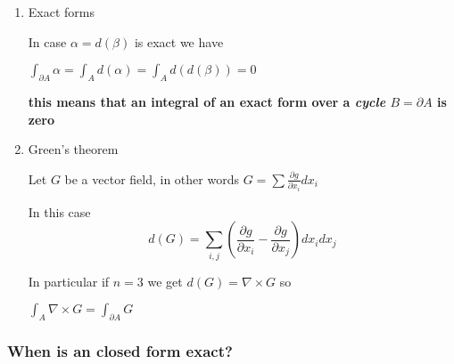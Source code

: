 \documentclass[11pt]{article}
\begin{document}
\begin{enumerate}
\item Exact forms
\label{sec:orgdaad73a}

In case \(\alpha = d(\beta)\) is exact we have

\(\int_{\partial A} \alpha = \int_A d(\alpha) = \int_A d(d(\beta)) = 0\)

\textbf{\textbf{this means that an integral of an exact form over a \emph{cycle} \(B = \partial A\) is zero}}

\item Green's theorem
\label{sec:orgdf67586}

Let \(G\) be a vector field, in other words \(G = \sum \frac{\partial g}{\partial x_i} dx_i\)

In this case
$$d(G) = \sum_{i,j} (\frac{\partial g}{\partial x_i} - \frac{\partial g}{\partial x_j}) dx_i dx_j$$

In particular if \(n = 3\) we get \(d(G) = \nabla \times G\) so

\(\int_A \nabla \times G = \int_{\partial A} G\)
\end{enumerate}


\subsubsection{When is an closed form exact?}
\label{sec:orga32b6ff}
\end{document}

